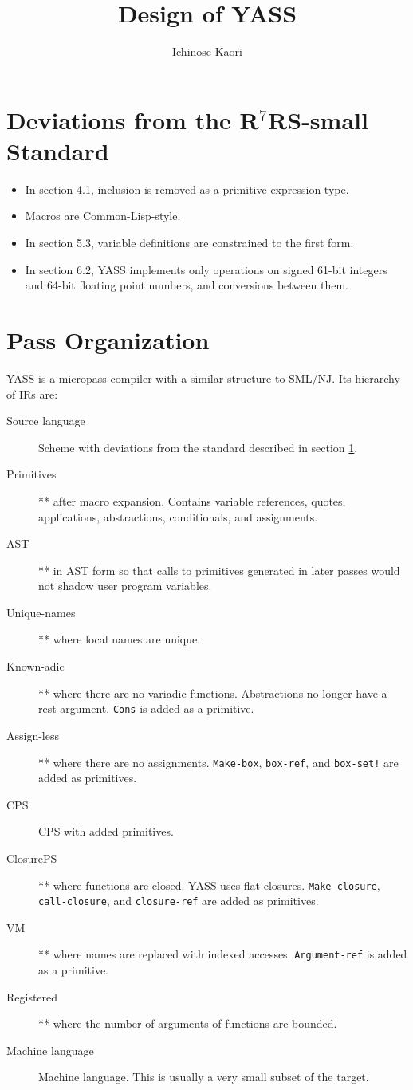 \documentclass{article}
\title{Design of YASS}
\author{Ichinose Kaori}
\begin{document}
\maketitle

\section{Deviations from the R$^7$RS-small Standard}

\label{deviations}

\begin{itemize}
\item In section 4.1, inclusion is removed as a primitive expression type.
\item Macros are Common-Lisp-style.
\item In section 5.3, variable definitions are constrained to the first form.
\item In section 6.2, YASS implements only operations on signed 61-bit integers and 64-bit floating point
  numbers, and conversions between them.
\end{itemize}

\section{Pass Organization}

YASS is a micropass compiler with a similar structure to SML/NJ. Its hierarchy of IRs are:

\begin{description}
\item[Source language] Scheme with deviations from the standard described in section
  \ref{deviations}.
\item[Primitives] ** after macro expansion. Contains variable references, quotes,
  applications, abstractions, conditionals, and assignments.
\item[AST] ** in AST form so that calls to primitives generated in later passes would not
  shadow user program variables.
\item[Unique-names] ** where local names are unique.
\item[Known-adic] ** where there are no variadic functions. Abstractions no longer have a
  rest argument. \verb|Cons| is added as a primitive.
\item[Assign-less] ** where there are no assignments. \verb|Make-box|, \verb|box-ref|, and
  \verb|box-set!| are added as primitives.
\item[CPS] CPS with added primitives.
\item[ClosurePS] ** where functions are closed. YASS uses flat closures.
  \verb|Make-closure|, \verb|call-closure|, and \verb|closure-ref| are added as primitives.
\item[VM] ** where names are replaced with indexed accesses. \verb|Argument-ref| is added
  as a primitive.
\item[Registered] ** where the number of arguments of functions are bounded.
\item[Machine language] Machine language. This is usually a very small subset of the
  target.
\end{description}
\end{document}
